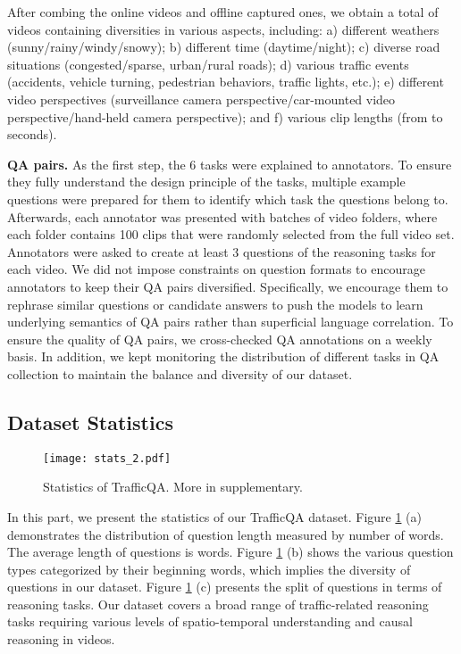 \documentclass[final]{cvpr}
\begin{document}
After combing the online videos and offline captured ones, we obtain a total of  videos containing diversities in various aspects, including: a) different weathers (sunny/rainy/windy/snowy); b) different time (daytime/night); c) diverse road situations (congested/sparse, urban/rural roads); d) various traffic events (accidents, vehicle turning, pedestrian behaviors, traffic lights, etc.); e) different video perspectives (surveillance camera perspective/car-mounted video perspective/hand-held camera perspective); and f) various clip lengths (from  to  seconds).


{\bf QA pairs.} As the first step, the 6 tasks were explained to annotators. To ensure they fully understand the design principle of the tasks, multiple example questions were prepared for them to identify which task the questions belong to. Afterwards, each annotator was presented with batches of video folders, where each folder contains 100 clips that were randomly selected from the full video set. Annotators were asked to create at least 3 questions of the reasoning tasks for each video.
We did not impose constraints on question formats to encourage annotators to keep their QA pairs diversified. Specifically, we encourage them to rephrase similar questions or candidate answers to push the models to learn underlying semantics of QA pairs rather than superficial language correlation. 
To ensure the quality of QA pairs, we cross-checked QA annotations on a weekly basis. 
In addition, we kept monitoring the distribution of different tasks in QA collection to maintain the balance and diversity of our dataset.

\subsection{Dataset Statistics}

\begin{figure}[h]
\begin{center}
    \texttt{[image: stats\_2.pdf]}
\end{center}
\vspace{-0.4cm}
\caption{Statistics of TrafficQA. More in supplementary.
}
\label{fig:Dataset_stats}
\vspace{-0.2cm}
\end{figure}

In this part, we present the statistics of our TrafficQA dataset. Figure \ref{fig:Dataset_stats} (a) demonstrates the distribution of question length measured by number of words. The average length of questions is  words. Figure \ref{fig:Dataset_stats} (b) shows the various question types categorized by their beginning words, which implies the diversity of questions in our dataset.
Figure \ref{fig:Dataset_stats} (c) presents the split of questions in terms of reasoning tasks.  Our dataset covers a broad range of traffic-related reasoning tasks requiring various levels of spatio-temporal understanding and causal reasoning in videos. 
\end{document}
